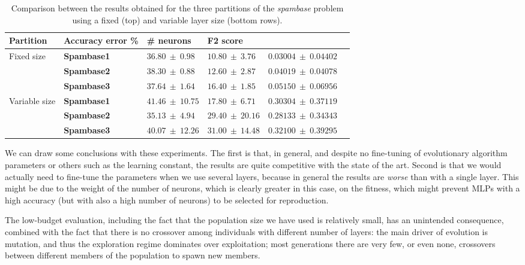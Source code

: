 \documentclass[conference]{IEEEtran}\usepackage[]{graphicx}\usepackage[]{color}
\begin{document}
\begin{table*}
    \centering
    \caption{
        Comparison between the results obtained for the three partitions of the
        \emph{spambase} problem using a fixed (top) and variable layer size (bottom rows). %
    }
    \label{tab:spambase}
    \begin{tabular}{ll|l|l|l|l}
        \textbf{Partition} & \textbf{Accuracy error \%} & \textbf{\# neurons} & \textbf{F2 score} \\
        \hline
        Fixed size &\textbf{Spambase1}   & $36.80\ \pm\ 0.98$ & $10.80\ \pm\ 3.76$ & $0.03004\ \pm\ 0.04402$ \\
        &\textbf{Spambase2}   & $38.30\ \pm\ 0.88$ & $12.60\ \pm\ 2.87$ & $0.04019\ \pm\ 0.04078$ \\
        &\textbf{Spambase3}   & $37.64\ \pm\ 1.64$ & $16.40\ \pm\ 1.85$ & $0.05150\ \pm\ 0.06956$ \\
        \hline
        Variable size &\textbf{Spambase1}   & $41.46\ \pm\ 10.75$ & $17.80\ \pm\ 6.71$ & $0.30304\ \pm\ 0.37119$ \\
        &\textbf{Spambase2}   & $35.13\ \pm\ 4.94$ & $29.40\ \pm\ 20.16$ & $0.28133\ \pm\ 0.34343$ \\
        &\textbf{Spambase3}   & $40.07\ \pm\ 12.26$ & $31.00\ \pm\ 14.48$ & $0.32100\ \pm\ 0.39295$ \\
    \end{tabular}
\end{table*}

We can draw some conclusions with these experiments. The first is
that, in general, and despite no fine-tuning of evolutionary algorithm
parameters or others such as the learning constant, the results are
quite competitive with the state of the art. Second is that we would
actually need to fine-tune the parameters when we use several layers,
because in general the results are {\em worse} than with a single
layer. This might be due to the weight of the number of neurons, which
is clearly greater in this case, on the fitness, which might prevent
MLPs with a high accuracy (but with also a high number of neurons) to
be selected for reproduction.

The low-budget evaluation, including the fact that the population size
we have used is relatively small, has an unintended consequence,
combined with the fact that there is no crossover among individuals
with different number of layers: the main driver of evolution is
mutation, and thus the exploration regime dominates over exploitation;
most generations there are very few, or even none, crossovers between
different members of the population to spawn new members.
\end{document}
